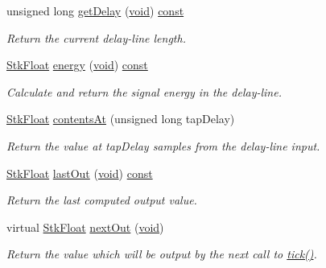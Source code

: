 \begin{DoxyCompactItemize}
unsigned long \hyperlink{class_nyq_1_1_delay_a758e566b4913e6a7b3abd3e690a5b95d}{get\+Delay} (\hyperlink{sound_8c_ae35f5844602719cf66324f4de2a658b3}{void}) \hyperlink{getopt1_8c_a2c212835823e3c54a8ab6d95c652660e}{const} 
\begin{DoxyCompactList}\small\item\em Return the current delay-\/line length. \end{DoxyCompactList}\item 
\hyperlink{namespace_nyq_a044fa20a706520a617bbbf458a7db7e4}{Stk\+Float} \hyperlink{class_nyq_1_1_delay_ac5d4e3ca4538fddb3a072fd926590688}{energy} (\hyperlink{sound_8c_ae35f5844602719cf66324f4de2a658b3}{void}) \hyperlink{getopt1_8c_a2c212835823e3c54a8ab6d95c652660e}{const} 
\begin{DoxyCompactList}\small\item\em Calculate and return the signal energy in the delay-\/line. \end{DoxyCompactList}\item 
\hyperlink{namespace_nyq_a044fa20a706520a617bbbf458a7db7e4}{Stk\+Float} \hyperlink{class_nyq_1_1_delay_a74d415d07391079b5efd40dc58369946}{contents\+At} (unsigned long tap\+Delay)
\begin{DoxyCompactList}\small\item\em Return the value at {\itshape tap\+Delay} samples from the delay-\/line input. \end{DoxyCompactList}\item 
\hyperlink{namespace_nyq_a044fa20a706520a617bbbf458a7db7e4}{Stk\+Float} \hyperlink{class_nyq_1_1_delay_ac641435b42f33d86c093e25abf8e6daf}{last\+Out} (\hyperlink{sound_8c_ae35f5844602719cf66324f4de2a658b3}{void}) \hyperlink{getopt1_8c_a2c212835823e3c54a8ab6d95c652660e}{const} 
\begin{DoxyCompactList}\small\item\em Return the last computed output value. \end{DoxyCompactList}\item 
virtual \hyperlink{namespace_nyq_a044fa20a706520a617bbbf458a7db7e4}{Stk\+Float} \hyperlink{class_nyq_1_1_delay_af607f8392837a3fd11a3aa77adfdff12}{next\+Out} (\hyperlink{sound_8c_ae35f5844602719cf66324f4de2a658b3}{void})
\begin{DoxyCompactList}\small\item\em Return the value which will be output by the next call to \hyperlink{class_nyq_1_1_delay_a1ca7b9275f434e1f1b1808c2dc8b461f}{tick()}. \end{DoxyCompactList}\item 

\end{DoxyCompactItemize}
